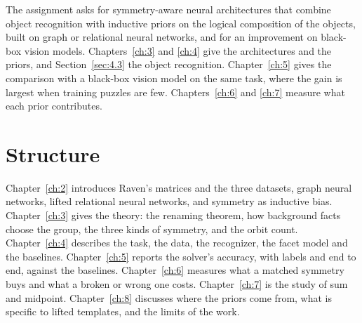 The assignment asks for symmetry-aware neural architectures that combine object recognition with inductive priors on the logical composition of the objects, built on graph or relational neural networks, and for an improvement on black-box vision models. Chapters~\ref{ch:3} and \ref{ch:4} give the architectures and the priors, and Section~\ref{sec:4.3} the object recognition. Chapter~\ref{ch:5} gives the comparison with a black-box vision model on the same task, where the gain is largest when training puzzles are few. Chapters~\ref{ch:6} and \ref{ch:7} measure what each prior contributes.

\section{Structure}\label{sec:1.6}

Chapter~\ref{ch:2} introduces Raven's matrices and the three datasets, graph neural networks, lifted relational neural networks, and symmetry as inductive bias. Chapter~\ref{ch:3} gives the theory: the renaming theorem, how background facts choose the group, the three kinds of symmetry, and the orbit count. Chapter~\ref{ch:4} describes the task, the data, the recognizer, the facet model and the baselines. Chapter~\ref{ch:5} reports the solver's accuracy, with labels and end to end, against the baselines. Chapter~\ref{ch:6} measures what a matched symmetry buys and what a broken or wrong one costs. Chapter~\ref{ch:7} is the study of sum and midpoint. Chapter~\ref{ch:8} discusses where the priors come from, what is specific to lifted templates, and the limits of the work.
